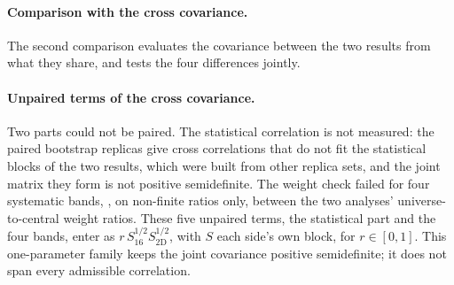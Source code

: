 \paragraph{Comparison with the cross covariance.} The second comparison evaluates the covariance between the two results from what they share, and tests the four differences jointly.

\paragraph{Unpaired terms of the cross covariance.} Two parts could not be paired. The statistical correlation is not measured: the paired bootstrap replicas give cross correlations that do not fit the statistical blocks of the two results, which were built from other replica sets, and the joint matrix they form is not positive semidefinite. The weight check failed for four systematic bands, , on non-finite ratios only, between the two analyses' universe-to-central weight ratios. These five unpaired terms, the statistical part and the four bands, enter as $r\,S_{16}^{1/2}S_{\mathrm{2D}}^{1/2}$, with $S$ each side's own block, for $r\in[0,1]$. This one-parameter family keeps the joint covariance positive semidefinite; it does not span every admissible correlation.

